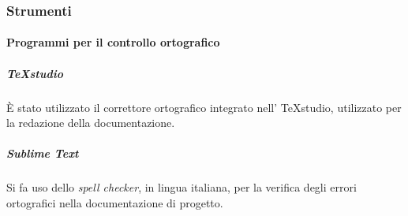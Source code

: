 



        \subsubsection{Strumenti}

            \paragraph{Programmi per il controllo ortografico}

                \subparagraph{TeXstudio}
                	È stato utilizzato il correttore ortografico integrato nell' TeXstudio, utilizzato per la redazione della documentazione.

                \subparagraph{Sublime Text}
                    Si fa uso dello \textit{spell checker}, in lingua italiana, per la verifica degli errori ortografici nella documentazione di progetto.

